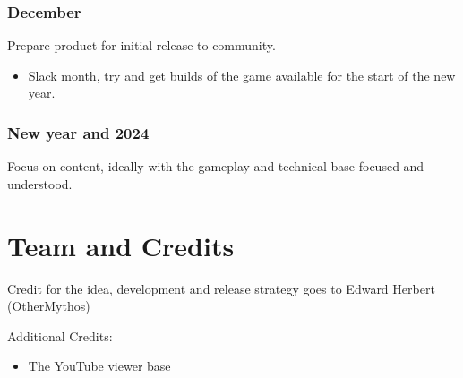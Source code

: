 \documentclass[a4paper]{scrreprt}
\begin{document}
\subsection{December}
Prepare product for initial release to community.

    \begin{itemize}
        \item Slack month, try and get builds of the game available for the start of the new year.
    \end{itemize}

\subsection{New year and 2024}
Focus on content, ideally with the gameplay and technical base focused and understood.

%



\chapter{Team and Credits}

Credit for the idea, development and release strategy goes to Edward Herbert (OtherMythos)

Additional Credits:

    \begin{itemize}
        \item The YouTube viewer base
    \end{itemize}



%
%
\end{document}
